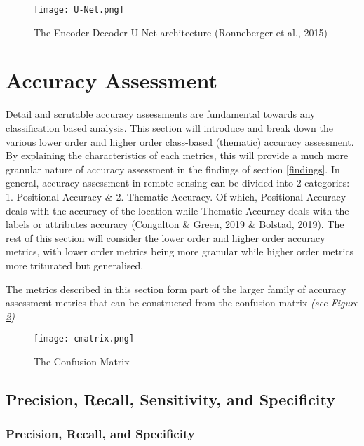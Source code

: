 \documentclass[11pt, a4paper, twoside]{report}
\begin{document}
\begin{figure}[H]
  \centering
  \texttt{[image: U-Net.png]}
  \caption{The Encoder-Decoder U-Net architecture (Ronneberger et al., 2015)}
  \label{fig:U-Net}
\end{figure}

\section{Accuracy Assessment}\label{AccAss}

Detail and scrutable accuracy assessments are fundamental towards any classification based analysis. This section will introduce and break down the various lower order and higher order class-based (thematic) accuracy assessment. By explaining the characteristics of each metrics, this will provide a much more granular nature of accuracy assessment in the findings of section \ref{findings}. In general, accuracy assessment in remote sensing can be divided into 2 categories: 1. Positional Accuracy \& 2. Thematic Accuracy. Of which, Positional Accuracy deals with the accuracy of the location while Thematic Accuracy deals with the labels or attributes accuracy (Congalton \& Green, 2019 \& Bolstad, 2019). The rest of this section will consider the lower order and higher order accuracy metrics, with lower order metrics being more granular while higher order metrics more triturated but generalised.\\\par

The metrics described in this section form part of the larger family of accuracy assessment metrics that can be constructed from the confusion matrix \textit{(see Figure \ref{fig:cmatrix})}

\begin{figure}[H]
  \centering
  \texttt{[image: cmatrix.png]}
  \caption{The Confusion Matrix}
  \label{fig:cmatrix}
\end{figure}

\subsection{Precision, Recall, Sensitivity, and Specificity}\label{1storder}
\subsubsection{Precision, Recall, and Specificity}\label{PR&S}
\end{document}
